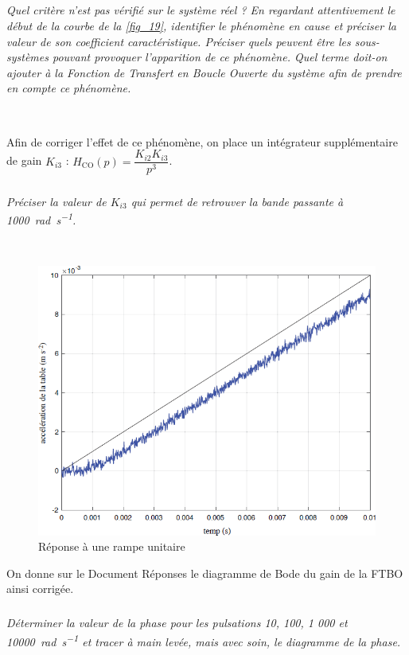 \documentclass[10pt,fleqn]{article} %
\begin{document}
\subparagraph{\label{q_43}}\textit{Quel critère n’est pas vérifié sur le système réel ? En regardant attentivement le début de
la courbe de la \autoref{fig_19}, identifier le phénomène en cause et préciser la valeur de son
coefficient caractéristique. Préciser quels peuvent être les sous-systèmes pouvant provoquer
l’apparition de ce phénomène. Quel terme doit-on ajouter à la Fonction de Transfert en
Boucle Ouverte du système afin de prendre en compte ce phénomène.}
\ifprof
\begin{corrige} ~\\

\end{corrige}
\else
\fi

Afin de corriger l’effet de ce phénomène, on place un intégrateur supplémentaire de gain $K_{i3}$ :
$H_\text{CO}(p)=\dfrac{K_{i2}K_{i3}}{p^3}$.

\subparagraph{\label{q_44}}\textit{Préciser la valeur de $K_{i3}$ qui permet de retrouver la bande passante à \SI{1000}{rad.s^{-1}}.}
\ifprof
\begin{corrige} ~\\

\end{corrige}
\else
\fi

\begin{figure}[H]
\centering
\includegraphics[width=0.6\linewidth]{fig_23}
\caption{Réponse à une rampe unitaire \label{fig_23}}
\end{figure}

On donne sur le Document Réponses le diagramme de Bode du gain de la FTBO ainsi corrigée.


\subparagraph{\label{q_45}}\textit{Déterminer la valeur de la phase pour les pulsations 10, 100, 1 000 et \SI{10 000}{rad.s^{-1}} et tracer
à main levée, mais avec soin, le diagramme de la phase.}
\ifprof
\begin{corrige} ~\\

\end{corrige}
\else
\fi
\end{document}
